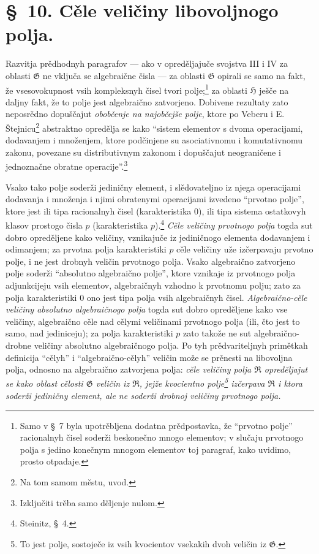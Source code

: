 \documentclass[11pt]{article}
\begin{document}
\section*{\S\ 10. Cěle veličiny libovoljnogo polja.}

Razvitja prědhodnyh paragrafov --- ako v opreděljajuče svojstva III i IV za
oblasti $\mathfrak G$ ne vključa se algebraične čisla --- za oblasti
$\mathfrak G$ opirali se samo na fakt, že vsesovokupnost vsih kompleksnyh čisel
tvori polje;\footnote{Samo v \S\ 7 byla upotrěbljena dodatna prědpostavka, že
``prvotno polje'' racionalnyh čisel soderži beskonečno mnogo elementov; v
slučaju prvotnogo polja s jedino konečnym mnogom elementov toj paragraf, kako
uvidimo, prosto otpadaje.} za oblasti $\mathfrak H$ ješče na daljny fakt, že
to polje jest algebraično zatvorjeno. Dobivene rezultaty zato neposrědno
dopuščajut {\itshape obobčenje na najobčejše polje}, ktore po Veberu i
E. Štejnicu\footnote{Na tom samom městu, uvod.} abstraktno opredělja se kako
``sistem elementov s dvoma operacijami, dodavanjem i množenjem, ktore podčinjene
su asociativnomu i komutativnomu zakonu, povezane su distributivnym zakonom i
dopuščajut neograničene i jednoznačne obratne operacije''.\footnote{Izključiti
trěba samo děljenje nulom.}

Vsako tako polje soderži jediničny element, i slědovateljno iz njega operacijami
dodavanja i množenja i njimi obratenymi operacijami izvedeno ``prvotno polje'',
ktore jest ili tipa racionalnyh čisel (karakteristika $0$), ili tipa sistema
ostatkovyh klasov prostogo čisla $p$ (karakteristika $p$).\footnote{Steinitz,
\S\ 4.} {\itshape Cěle veličiny prvotnogo polja} togda sut dobro opreděljene
kako veličiny, vznikajuče iz jediničnogo elementa dodavanjem i odimanjem; za
prvotna polja karakteristiki $p$ cěle veličiny uže izčerpavaju prvotno polje, i
ne jest drobnyh veličin prvotnogo polja. Vsako algebraično zatvorjeno polje
soderži ``absolutno algebraično polje'', ktore vznikaje iz prvotnogo polja
adjunkcijeju vsih elementov, algebraičnyh vzhodno k prvotnomu polju; zato za
polja karakteristiki $0$ ono jest tipa polja vsih algebraičnyh čisel.
{\itshape Algebraično-cěle veličiny absolutno algebraičnogo polja} togda sut
dobro opreděljene kako vse veličiny, algebraično cěle nad cělymi veličinami
prvotnogo polja (ili, čto jest to samo, nad jediniceju); za polja
karakteristiki $p$ zato takože ne sut algebraično-drobne veličiny absolutno
algebraičnogo polja. Po tyh prědvariteljnyh primětkah definicija ``cělyh'' i
``algebraično-cělyh'' veličin može se prěnesti na libovoljna polja, odnosno na
algebraično zatvorjena polja: {\itshape cěle veličiny polja $\mathfrak R$
opreděljajut se kako oblast cělosti $\mathfrak G$ veličin iz $\mathfrak R$,
jejže kvocientno polje\footnote{To jest polje, sostoječe iz vsih kvocientov
vsekakih dvoh veličin iz $\mathfrak G$.} izčerpava $\mathfrak R$ i ktora soderži
jediničny element, ale ne soderži drobnoj veličiny prvotnogo polja.}
\end{document}
